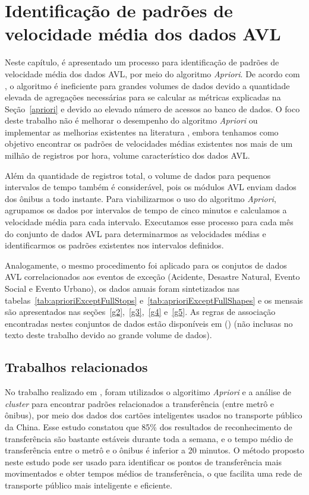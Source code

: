 \documentclass[
	12pt,				%
	oneside,			%
	a4paper,			%
	english,			%
	brazil				%
	]{abntex2ppgsi}
\begin{document}
{{{\section{Identificação de padrões de velocidade média dos dados AVL}
\label{expApriori}
Neste capítulo, é apresentado um processo para identificação de padrões de velocidade média dos dados AVL, por meio do algoritmo \textit{Apriori}. De acordo com \cite{xie2008optimization}, o algoritmo é ineficiente para grandes volumes de dados devido a quantidade elevada de agregações necessárias para se calcular as métricas explicadas na Seção~\ref{apriori} e devido ao elevado número de acessos ao banco de dados. O foco deste trabalho não é melhorar o desempenho do algoritmo \textit{Apriori} ou implementar as melhorias existentes na literatura \cite{xie2008optimization, zhang2014method}, embora tenhamos como objetivo encontrar os padrões de velocidades médias existentes nos mais de um milhão de registros por hora, volume característico dos dados AVL. 

Além da quantidade de registros total, o volume de dados para pequenos intervalos de tempo também é considerável, pois os módulos AVL enviam dados dos ônibus a todo instante. Para viabilizarmos o uso do algoritmo \textit{Apriori}, agrupamos os dados por intervalos de tempo de cinco minutos e calculamos a velocidade média para cada intervalo. Executamos esse processo para cada mês do conjunto de dados AVL para determinarmos as velocidades médias e identificarmos os padrões existentes nos intervalos definidos.

Analogamente, o mesmo procedimento foi aplicado para os conjutos de dados AVL correlacionados aos eventos de exceção (Acidente, Desastre Natural, Evento Social e Evento Urbano), os dados anuais foram sintetizados nas tabelas~\ref{tab:aprioriExceptFullStops} e~\ref{tab:aprioriExceptFullShapes} e os mensais são apresentados nas seções~\ref{g2},~\ref{g3},~\ref{g4} e~\ref{g5}. As regras de associação encontradas nestes conjuntos de dados estão disponíveis em \citeauthor{fcas} (\citeyear{fcas}) (não inclusas no texto deste trabalho devido ao  grande volume de dados). 

\subsection{Trabalhos relacionados}

No trabalho realizado em \cite{zhao2019recognizing}, foram utilizados o algoritimo \textit{Apriori} e a análise de \textit{cluster} para encontrar padrões relacionados a transferência (entre metrô e ônibus), por meio dos dados dos cartões inteligentes usados no transporte público da China. Esse estudo constatou que 85\% dos resultados de reconhecimento de transferência são bastante estáveis durante toda a semana, e o tempo médio de transferência entre o metrô e o ônibus é inferior a 20 minutos. O método proposto neste estudo pode ser usado para identificar os pontos de transferência mais movimentados e obter tempos médios de transferência, o que facilita uma rede de transporte público mais inteligente e eficiente.

}}}
\end{document}
